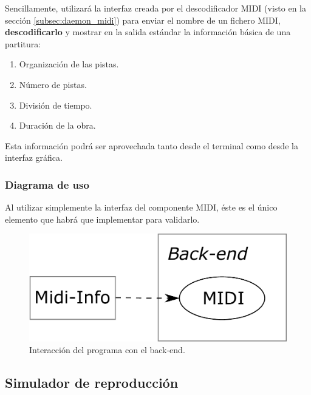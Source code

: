 Sencillamente, utilizará la interfaz creada por el descodificador \acrshort{MIDI} (visto en la sección \ref{subsec:daemon_midi}) para enviar el nombre de un fichero \acrshort{MIDI}, \textbf{descodificarlo} y mostrar en la salida estándar la información básica de una partitura:

\begin{enumerate}
	\item Organización de las pistas.
	\item Número de pistas.
	\item División de tiempo.
	\item Duración de la obra.
\end{enumerate}

Esta información podrá ser aprovechada tanto desde el terminal como desde la interfaz gráfica.

\subsubsection{Diagrama de uso}

Al utilizar simplemente la interfaz del componente \acrshort{MIDI}, éste es el único elemento que habrá que implementar para validarlo.

\smallskip

\begin{figure}[H]
	\noindent \begin{centering}
		\includegraphics[width=\linewidth/3]{capitulo4/midi_info}
		\par\end{centering}
	\smallskip
	\caption{\label{fig:midi_info} Interacción del programa con el back-end.}
\end{figure} 

\smallskip

\subsection{Simulador de reproducción}

